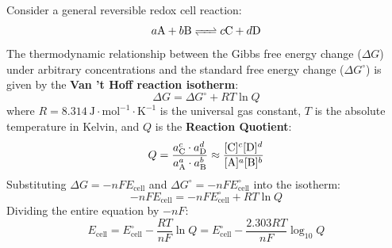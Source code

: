 Consider a general reversible redox cell reaction:
\begin{equation}
    a\ce{A} + b\ce{B} \ce{<=>} c\ce{C} + d\ce{D}
\end{equation}
The thermodynamic relationship between the Gibbs free energy change ($\Delta G$) under arbitrary concentrations and the standard free energy change ($\Delta G^\circ$) is given by the \textbf{Van 't Hoff reaction isotherm}:
\begin{equation}
    \Delta G = \Delta G^\circ + RT \ln Q
\end{equation}
where $R = 8.314\ \text{J}\cdot\text{mol}^{-1}\cdot\text{K}^{-1}$ is the universal gas constant, $T$ is the absolute temperature in Kelvin, and $Q$ is the \textbf{Reaction Quotient}:
\begin{equation}
    Q = \frac{a_{\ce{C}}^c \cdot a_{\ce{D}}^d}{a_{\ce{A}}^a \cdot a_{\ce{B}}^b} \approx \frac{[\ce{C}]^c [\ce{D}]^d}{[\ce{A}]^a [\ce{B}]^b}
\end{equation}
Substituting $\Delta G = -nFE_{\text{cell}}$ and $\Delta G^\circ = -nFE^\circ_{\text{cell}}$ into the isotherm:
\begin{equation}
    -n F E_{\text{cell}} = -n F E^\circ_{\text{cell}} + RT \ln Q
\end{equation}
Dividing the entire equation by $-nF$:
\begin{equation}
    \boxed{E_{\text{cell}} = E^\circ_{\text{cell}} - \frac{RT}{nF} \ln Q = E^\circ_{\text{cell}} - \frac{2.303 RT}{nF} \log_{10} Q}
\end{equation}

